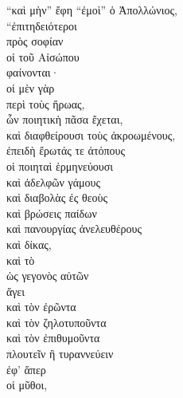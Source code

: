 
{\large
\begin{greek}
\noindent ``καὶ μὴν'' ἔφη ``ἐμοὶ'' ὁ Ἀπολλώνιος, \\
``ἐπιτηδειότεροι \\
\tabto{2em} πρὸς σοφίαν \\
οἱ τοῦ Αἰσώπου \\
φαίνονται· \\
οἱ μὲν γὰρ \\
\tabto{2em} περὶ τοὺς ἥρωας, \\
\tabto{4em} ὧν ποιητικὴ πᾶσα ἔχεται, \\
καὶ διαφθείρουσι τοὺς ἀκροωμένους, \\
\tabto{2em} ἐπειδὴ ἔρωτάς τε ἀτόπους \\
\tabto{2em} οἱ ποιηταὶ ἑρμηνεύουσι \\
καὶ ἀδελφῶν γάμους \\
καὶ διαβολὰς ἐς θεοὺς \\
καὶ βρώσεις παίδων \\
καὶ πανουργίας ἀνελευθέρους \\
καὶ δίκας, \\
καὶ τὸ \\
\tabto{2em} ὡς γεγονὸς αὐτῶν \\
ἄγει \\
καὶ τὸν ἐρῶντα \\
καὶ τὸν ζηλοτυποῦντα \\
καὶ τὸν ἐπιθυμοῦντα \\
\tabto{2em} πλουτεῖν ἢ τυραννεύειν \\
ἐφ' ἅπερ \\
\tabto{2em} οἱ μῦθοι,\\

\end{greek}
}


